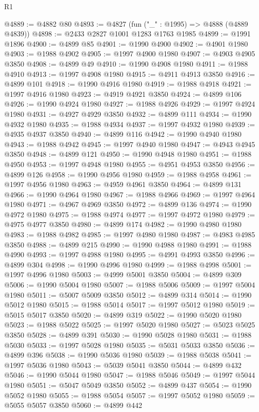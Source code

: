 \begin{lexlean}{R1}
\begin{coremodule}
@4889 := @4882 @80
@4893 := @4827 (fun ("_" : @1995) => @4888 (@4889 @4839))
@4898 := @2433 @2827 @1001 @1283 @1763 @1985
@4899 := @1991 @1896
@4900 := @4899 @85
@4901 := @1990 @4900
@4902 := @4901 @1980
@4903 := @1988 @4902
@4905 := @1997 @4900 @1980
@4907 := @4903 @4905 @3850
@4908 := @4899 @49
@4910 := @1990 @4908 @1980
@4911 := @1988 @4910
@4913 := @1997 @4908 @1980
@4915 := @4911 @4913 @3850
@4916 := @4899 @101
@4918 := @1990 @4916 @1980
@4919 := @1988 @4918
@4921 := @1997 @4916 @1980
@4923 := @4919 @4921 @3850
@4924 := @4899 @106
@4926 := @1990 @4924 @1980
@4927 := @1988 @4926
@4929 := @1997 @4924 @1980
@4931 := @4927 @4929 @3850
@4932 := @4899 @111
@4934 := @1990 @4932 @1980
@4935 := @1988 @4934
@4937 := @1997 @4932 @1980
@4939 := @4935 @4937 @3850
@4940 := @4899 @116
@4942 := @1990 @4940 @1980
@4943 := @1988 @4942
@4945 := @1997 @4940 @1980
@4947 := @4943 @4945 @3850
@4948 := @4899 @121
@4950 := @1990 @4948 @1980
@4951 := @1988 @4950
@4953 := @1997 @4948 @1980
@4955 := @4951 @4953 @3850
@4956 := @4899 @126
@4958 := @1990 @4956 @1980
@4959 := @1988 @4958
@4961 := @1997 @4956 @1980
@4963 := @4959 @4961 @3850
@4964 := @4899 @131
@4966 := @1990 @4964 @1980
@4967 := @1988 @4966
@4969 := @1997 @4964 @1980
@4971 := @4967 @4969 @3850
@4972 := @4899 @136
@4974 := @1990 @4972 @1980
@4975 := @1988 @4974
@4977 := @1997 @4972 @1980
@4979 := @4975 @4977 @3850
@4980 := @4899 @174
@4982 := @1990 @4980 @1980
@4983 := @1988 @4982
@4985 := @1997 @4980 @1980
@4987 := @4983 @4985 @3850
@4988 := @4899 @215
@4990 := @1990 @4988 @1980
@4991 := @1988 @4990
@4993 := @1997 @4988 @1980
@4995 := @4991 @4993 @3850
@4996 := @4899 @304
@4998 := @1990 @4996 @1980
@4999 := @1988 @4998
@5001 := @1997 @4996 @1980
@5003 := @4999 @5001 @3850
@5004 := @4899 @309
@5006 := @1990 @5004 @1980
@5007 := @1988 @5006
@5009 := @1997 @5004 @1980
@5011 := @5007 @5009 @3850
@5012 := @4899 @314
@5014 := @1990 @5012 @1980
@5015 := @1988 @5014
@5017 := @1997 @5012 @1980
@5019 := @5015 @5017 @3850
@5020 := @4899 @319
@5022 := @1990 @5020 @1980
@5023 := @1988 @5022
@5025 := @1997 @5020 @1980
@5027 := @5023 @5025 @3850
@5028 := @4899 @391
@5030 := @1990 @5028 @1980
@5031 := @1988 @5030
@5033 := @1997 @5028 @1980
@5035 := @5031 @5033 @3850
@5036 := @4899 @396
@5038 := @1990 @5036 @1980
@5039 := @1988 @5038
@5041 := @1997 @5036 @1980
@5043 := @5039 @5041 @3850
@5044 := @4899 @432
@5046 := @1990 @5044 @1980
@5047 := @1988 @5046
@5049 := @1997 @5044 @1980
@5051 := @5047 @5049 @3850
@5052 := @4899 @437
@5054 := @1990 @5052 @1980
@5055 := @1988 @5054
@5057 := @1997 @5052 @1980
@5059 := @5055 @5057 @3850
@5060 := @4899 @442

\end{coremodule}
\end{lexlean}
